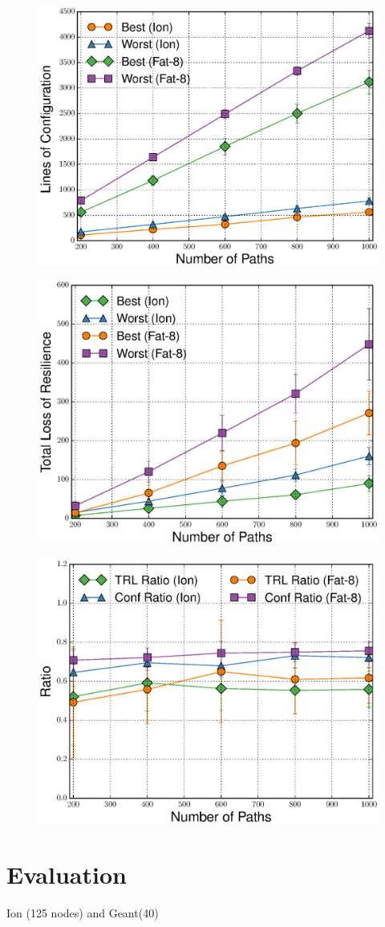 \begin{figure}
	\centering
	\includegraphics[width=0.7\columnwidth]{figures/confMCMC.eps}
	\label{fig:confmcmc}
\end{figure}

\begin{figure}
	\centering
	\includegraphics[width=0.7\columnwidth]{figures/TRLMCMC.eps}
	\label{fig:trlmcmc}
\end{figure}

\begin{figure}
	\centering
	\includegraphics[width=0.7\columnwidth]{figures/ratioMCMC.eps}
	\label{fig:ratiomcmc}
\end{figure}




\section{Evaluation}
Ion (125 nodes) and Geant(40)

